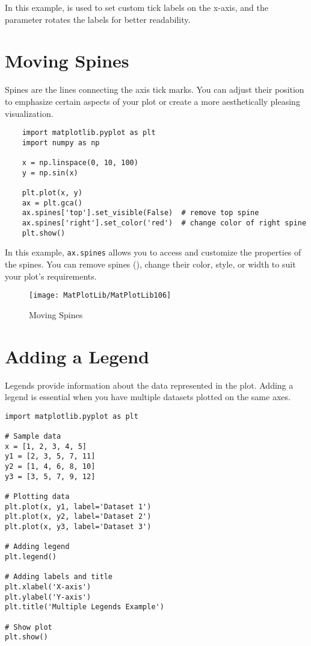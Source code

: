 In this example,  is used to set custom tick labels on the x-axis, and the  parameter rotates the labels for better readability.

\section*{Moving Spines}

Spines are the lines connecting the axis tick marks. You can adjust their position to emphasize certain aspects of your plot or create a more aesthetically pleasing visualization.

\begin{lstlisting}
	import matplotlib.pyplot as plt
	import numpy as np
	
	x = np.linspace(0, 10, 100)
	y = np.sin(x)
	
	plt.plot(x, y)
	ax = plt.gca()
	ax.spines['top'].set_visible(False)  # remove top spine
	ax.spines['right'].set_color('red')  # change color of right spine
	plt.show()
\end{lstlisting}

In this example, \texttt{ax.spines} allows you to access and customize the properties of the spines. You can remove spines (), change their color, style, or width to suit your plot's requirements.

\begin{figure}[h]
	\centering
	\texttt{[image: MatPlotLib/MatPlotLib106]}
	\caption{Moving Spines}\label{Matplotlib06}
\end{figure}


\section*{Adding a Legend}

Legends provide information about the data represented in the plot. Adding a legend is essential when you have multiple datasets plotted on the same axes.

\begin{lstlisting}
import matplotlib.pyplot as plt

# Sample data
x = [1, 2, 3, 4, 5]
y1 = [2, 3, 5, 7, 11]
y2 = [1, 4, 6, 8, 10]
y3 = [3, 5, 7, 9, 12]

# Plotting data
plt.plot(x, y1, label='Dataset 1')
plt.plot(x, y2, label='Dataset 2')
plt.plot(x, y3, label='Dataset 3')

# Adding legend
plt.legend()

# Adding labels and title
plt.xlabel('X-axis')
plt.ylabel('Y-axis')
plt.title('Multiple Legends Example')

# Show plot
plt.show()

\end{lstlisting}

